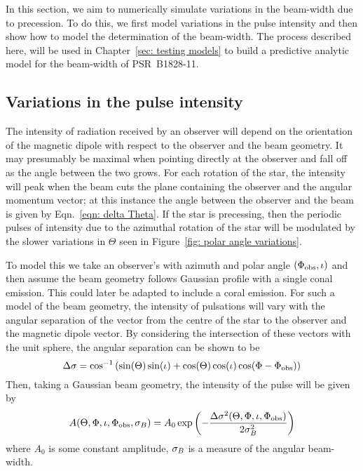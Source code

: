 \documentclass[../full_thesis/full_thesis.tex]{subfiles}
\begin{document}
In this section, we aim to numerically simulate variations in the beam-width
due to precession. To do this, we first model variations in the pulse intensity
and then show how to model the determination of the beam-width. The process
described here, will be used in Chapter~\ref{sec: testing models} to build a
predictive analytic model for the beam-width of PSR~B1828-11.

\subsection{Variations in the pulse intensity}

The intensity of radiation received by an observer will depend on the
orientation of the magnetic dipole with respect to the observer and the beam
geometry. It may presumably be maximal when pointing directly at the observer
and fall off as the angle between the two grows. For each rotation of the star,
the intensity will peak when the beam cuts the plane containing the observer
and the angular momentum vector; at this instance the angle between the
observer and the beam is given by Eqn.~\eqref{eqn: delta Theta}. If the star is
precessing, then the periodic pulses of intensity due to the azimuthal rotation
of the star will be modulated by the slower variations in $\Theta$ seen in
Figure~\ref{fig: polar angle variations}.

To model this we take an observer's with azimuth and polar angle $(\Phi_{\mathrm{obs}}, \iota)$ and then
assume the beam geometry follows Gaussian profile with a single conal emission.
This could later be adapted to include a coral emission.  For such a model of
the beam geometry, the intensity of pulsations will vary with the angular
separation of the vector from the centre of the star to the observer and the
magnetic dipole vector. By considering the intersection of these vectors with
the unit sphere, the angular separation can be shown to be
\begin{equation}
\Delta\sigma = \cos^{-1}\left(\sin(\Theta)\sin(\iota) +
                             \cos(\Theta)\cos(\iota)\cos(\Phi - \Phi_{\mathrm{obs}})\right)
\label{eqn: angular sep inv cos}
\end{equation}
Then, taking a Gaussian beam geometry, the intensity of the pulse will be given by
\begin{equation}
A(\Theta, \Phi, \iota, \Phi_{\mathrm{obs}}, \sigma_{B}) =
A_{0} \exp\left(-\frac{\Delta\sigma^{2}(\Theta, \Phi, \iota, \Phi_{\mathrm{obs}})}{2\sigma_{B}^{2}}\right)
\label{eqn: Gaussian beam intensity}
\end{equation}
where $A_{0}$ is some constant amplitude, $\sigma_{B}$ is a measure of the
angular beam-width.
\end{document}
